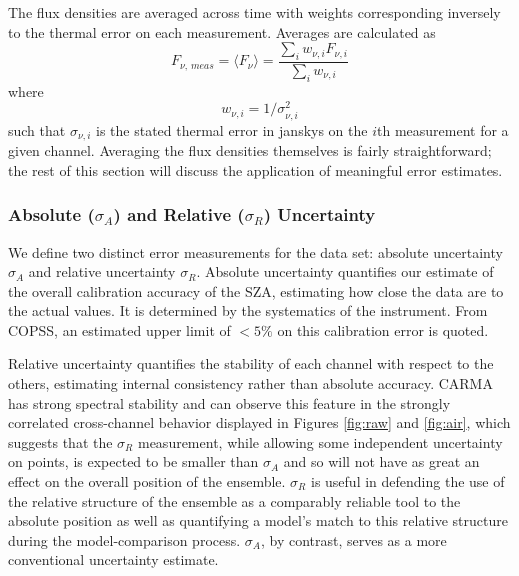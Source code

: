 \documentclass{article}
\begin{document}
	The flux densities are averaged across time with weights corresponding inversely to the thermal error on each measurement.
	Averages are calculated as
	$$F_{\nu,\,meas} = \langle F_{\nu} \rangle = \frac{ \sum_{i} w_{\nu, i} F_{\nu,i} }{ \sum_{i} w_{\nu, i} }$$
	where $$w_{\nu, i} = 1/\sigma_{\nu, i}^{2}$$
	such that $\sigma_{\nu, i}$ is the stated thermal error in janskys on the $i$th measurement for a given channel.
	Averaging the flux densities themselves is fairly straightforward; the rest of this section will discuss the application
	of meaningful error estimates.

\subsubsection{Absolute ($\sigma_{A}$) and Relative ($\sigma_{R}$) Uncertainty} \label{s:error}
	We define two distinct error measurements for the data set: absolute uncertainty $\sigma_{A}$ and relative uncertainty $\sigma_{R}$.
	Absolute uncertainty quantifies our estimate of the overall calibration accuracy of the SZA, estimating how close the data are to the actual values.  It is determined by the systematics of the instrument.
	From COPSS, an estimated upper limit of $<5\%$ on this calibration error is quoted.

	Relative uncertainty quantifies the stability of each channel with respect to the others, estimating internal consistency rather than absolute accuracy.
	CARMA has strong spectral stability and can observe this feature in the strongly correlated cross-channel behavior displayed in Figures \ref{fig:raw} and \ref{fig:air}, which suggests that the $\sigma_{R}$ measurement, while allowing some independent uncertainty on points, is expected to be smaller than $\sigma_{A}$ and so will not have as great an effect on the overall position of the ensemble.
	$\sigma_{R}$ is useful in defending the use of the relative structure of the ensemble as a comparably reliable tool to the absolute position as well as quantifying a model's match to this relative structure during the model-comparison process.
	$\sigma_{A}$, by contrast, serves as a more conventional uncertainty estimate.
\end{document}
